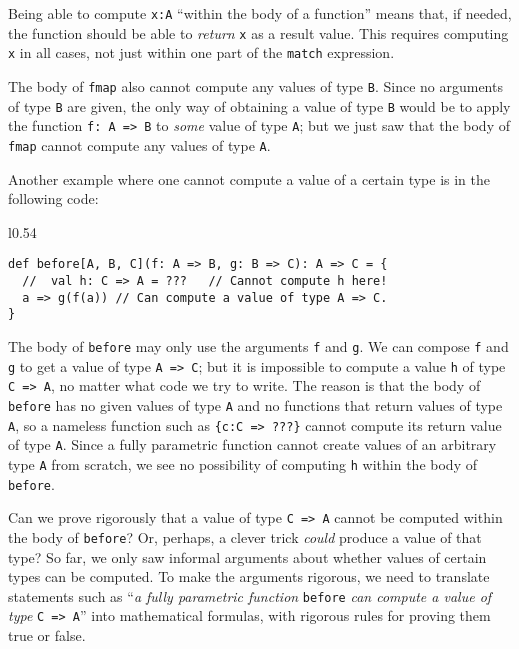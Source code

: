 Being able to compute \lstinline!x:A! \textsf{``}within the body of a function\textsf{''}
means that, if needed, the function should be able to \emph{return}
\lstinline!x! as a result value. This requires computing \lstinline!x!
in all cases, not just within one part of the \lstinline!match! expression. 

The body of \lstinline!fmap! also cannot compute any values of type
\lstinline!B!. Since no arguments of type \lstinline!B! are given,
the only way of obtaining a value of type \lstinline!B! would be
to apply the function \lstinline!f: A => B! to \emph{some} value
of type \lstinline!A!; but we just saw that the body of \lstinline!fmap!
cannot compute any values of type \lstinline!A!.

Another example where one cannot compute a value of a certain type
is in the following code:

\begin{wrapfigure}{l}{0.54\columnwidth}%
\vspace{-0.1\baselineskip}
\begin{lstlisting}
def before[A, B, C](f: A => B, g: B => C): A => C = {
  //  val h: C => A = ???   // Cannot compute h here!
  a => g(f(a)) // Can compute a value of type A => C.
}
\end{lstlisting}

\vspace{-1.2\baselineskip}
\end{wrapfigure}%

\noindent The body of \lstinline!before! may only use the arguments
\lstinline!f! and \lstinline!g!. We can compose \lstinline!f! and
\lstinline!g! to get a value of type \lstinline!A => C!; but it
is impossible to compute a value \lstinline!h! of type \lstinline!C => A!,
no matter what code we try to write. The reason is that the body of
\lstinline!before! has no given values of type \lstinline!A! and
no functions that return values of type \lstinline!A!, so a nameless
function such as \lstinline!{c:C => ???}! cannot compute its return
value of type \lstinline!A!. Since a fully parametric function cannot
create values of an arbitrary type \lstinline!A! from scratch, we
see no possibility of computing \lstinline!h! within the body of
\lstinline!before!.

Can we prove rigorously that a value of type \lstinline!C => A! cannot
be computed within the body of \lstinline!before!? Or, perhaps, a
clever trick \emph{could} produce a value of that type? So far, we
only saw informal arguments about whether values of certain types
can be computed. To make the arguments rigorous, we need to translate
statements such as \textsf{``}\emph{a fully parametric function} \lstinline!before!
\emph{can compute a value of type} \lstinline!C => A!\textsf{''} into mathematical
formulas, with rigorous rules for proving them true or false.

